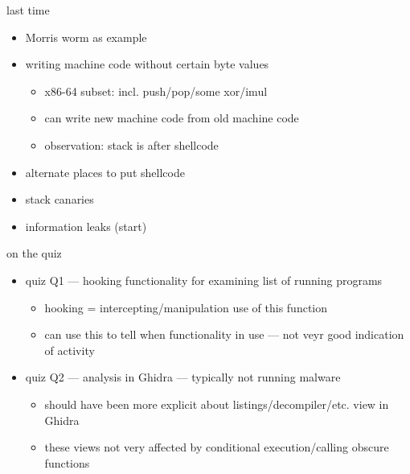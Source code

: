 \date{}
\title{}
\date{}

\begin{frame}
    \titlepage
\end{frame}






\begin{frame}{last time}
    \begin{itemize}
    \item Morris worm as example
    \item writing machine code without certain byte values
        \begin{itemize}
        \item x86-64 subset: incl. push/pop/some xor/imul
        \item can write new machine code from old machine code
        \item observation: stack is after shellcode
        \end{itemize}
    \item alternate places to put shellcode
    \item stack canaries
    \item information leaks (start)
    \end{itemize}
\end{frame}

\begin{frame}{on the quiz}
    \begin{itemize}
    \item quiz Q1 --- hooking functionality for examining list of running programs
        \begin{itemize}
        \item hooking = intercepting/manipulation use of this function
        \item can use this to tell when functionality in use --- not veyr good indication of activity
        \end{itemize}
    \item quiz Q2 --- analysis in Ghidra --- typically not running malware
        \begin{itemize}
        \item should have been more explicit about listings/decompiler/etc. view in Ghidra
        \item these views not very affected by conditional execution/calling obscure functions
        \end{itemize}
    \end{itemize}
\end{frame}

